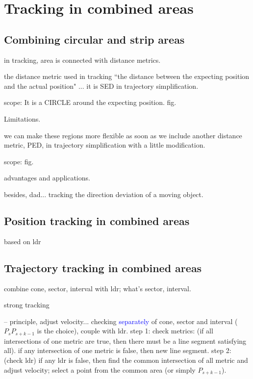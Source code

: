 

\section{Tracking in combined areas}
\label{sec:combine}


\subsection{Combining circular and strip areas}
in tracking, area is connected with distance metrics.

the distance metric used in tracking ``the distance between the expecting position and the actual position" ... it is SED in trajectory simplification. 

scope: It is  a CIRCLE around the expecting position. fig.

Limitations.

we can make these regions more flexible as soon as we include another distance metric, PED, in trajectory simplification with a little modification.

scope: fig.

advantages and applications.

besides, dad... tracking the direction deviation of a moving object.


\subsection{Position tracking in combined areas}
based on ldr




\subsection{Trajectory tracking in combined areas}

combine cone, sector, interval with ldr; what's sector, interval.


strong tracking

-- principle, adjust velocity...
	checking \textcolor{blue}{separately} of cone, sector and interval ($P_sP_{s+k-1}$ is the choice), couple with ldr.
	step 1: check metrics: (if all intersections of one metric are true, then there must be a line segment satisfying all).
	if any intersection of one metric is false, then new line segment.
	step 2:	(check ldr) if any ldr is false, then find the common intersection of all metric and adjust velocity; select a point from the common area (or simply $P_{s+k-1}$).

